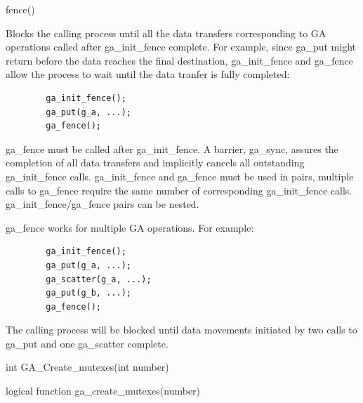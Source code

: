 \documentclass[12pt]{article}
\begin{document}
\begin{pyapi}
\begin{pycode}
fence() 
\end{pycode}
\end{pyapi}


\begin{desc}

Blocks the calling process until all the data transfers corresponding to GA 
operations called after ga_init_fence complete. For example, since ga_put 
might return before the data reaches the final destination, ga_init_fence 
and ga_fence allow the process to wait until the data tranfer is fully completed:
\begin{verbatim}
        ga_init_fence();
        ga_put(g_a, ...);
        ga_fence();
\end{verbatim}

ga_fence must be called after ga_init_fence. A barrier, ga_sync, assures the 
completion of all data transfers and implicitly cancels all outstanding 
ga_init_fence calls. ga_init_fence and ga_fence must be used in pairs, multiple 
calls to ga_fence require the same number of corresponding ga_init_fence calls. 
ga_init_fence/ga_fence pairs can be nested.

ga_fence works for multiple GA operations. For example:
\begin{verbatim}
        ga_init_fence();
        ga_put(g_a, ...);
        ga_scatter(g_a, ...);
        ga_put(g_b, ...);
        ga_fence();
\end{verbatim}

The calling process will be blocked until data movements initiated by two calls 
to ga_put and one ga_scatter complete.
\end{desc}


\begin{capi}
\begin{ccode}
int GA_Create_mutexes(int number)
\end{ccode}
\begin{funcargs}
\end{funcargs}
\end{capi}

\begin{fapi}
\begin{fcode}
logical function ga_create_mutexes(number)
\end{fcode}
\begin{funcargs}
\end{funcargs}
\end{fapi}
\end{document}

